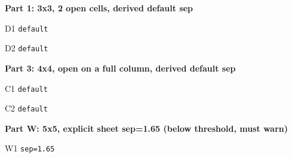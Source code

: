 \documentclass[varwidth=22cm, border=6pt]{standalone}
\begin{document}
\textbf{Part 1: 3x3, 2 open cells, derived default sep}

\medskip
D1 \texttt{default}\quad
\begin{tenkzplanes}[rows=3, cols=3, open={(1,2),(3,3)}]
\end{tenkzplanes}
\qquad
D2 \texttt{default}\quad
\begin{tenkzplanes}[rows=3, cols=3, open={(1,2),(3,3)}]
\end{tenkzplanes}

\bigskip
\textbf{Part 3: 4x4, open on a full column, derived default sep}

\medskip
C1 \texttt{default}\quad
\begin{tenkzplanes}[rows=4, cols=4, open={(1-4,2)}]
\end{tenkzplanes}
\qquad
C2 \texttt{default}\quad
\begin{tenkzplanes}[rows=4, cols=4, open={(1-4,2)}]
\end{tenkzplanes}

\bigskip
\textbf{Part W: 5x5, explicit sheet sep=1.65 (below threshold, must warn)}

\medskip
W1 \texttt{sep=1.65}\quad
\begin{tenkzplanes}[rows=5, cols=5, sheet sep=1.65]
\end{tenkzplanes}
\end{document}
